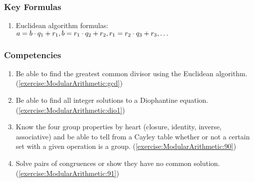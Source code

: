 \subsubsection*{Key Formulas}
\begin{enumerate}
\item
Euclidean algorithm formulas: $a = b \cdot q_{1} + r_{1}, b = r_{1} \cdot q_{2} + r_{2}, \\ r_{1} = r_{2} \cdot q_{3} + r_{3}, \dots$
\end{enumerate}

\subsubsection*{Competencies}
\begin{enumerate}
\item
Be able to find the greatest common divisor using the Euclidean algorithm. (\ref{exercise:ModularArithmetic:gcd})
\item
Be able to find all integer solutions to a Diophantine equation. (\ref{exercise:ModularArithmetic:dio1})
\item
Know the four group properties by heart (closure, identity, inverse, associative) and be able to tell from a Cayley table whether or not a certain set with a given operation is a group.  (\ref{exercise:ModularArithmetic:90})
\item
Solve pairs of congruences or show they have no common solution.(\ref{exercise:ModularArithmetic:91})
\end{enumerate}
